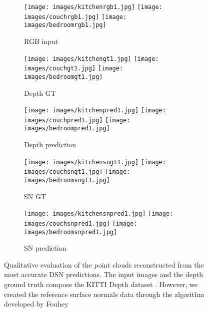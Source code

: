 \documentclass[5p]{elsarticle}
\begin{document}
\begin{figure*}[t!]
     \centering
         \begin{subfigure}[t]{0.19\textwidth}
         \centering
         \caption{RGB input}
         \texttt{[image: images/kitchenrgb1.jpg]}
         \hspace{1em}
         \texttt{[image: images/couchrgb1.jpg]}
         \hspace{1em}
         \texttt{[image: images/bedroomrgb1.jpg]}
         \label{subfig3d:0}
     \end{subfigure}
     \begin{subfigure}[t]{0.19\textwidth}
         \centering
         \caption{Depth GT}
         \texttt{[image: images/kitchengt1.jpg]}
         \hspace{1em}
         \texttt{[image: images/couchgt1.jpg]}
         \hspace{1em}
         \texttt{[image: images/bedroomgt1.jpg]}
         \label{subfig3d:1}
     \end{subfigure}
         \begin{subfigure}[t]{0.19\textwidth}
         \centering
         \caption{Depth prediction}
         \texttt{[image: images/kitchenpred1.jpg]}
         \hspace{1em}
         \texttt{[image: images/couchpred1.jpg]}
         \hspace{1em}
         \texttt{[image: images/bedroompred1.jpg]}
         \label{subfig3d:2}
     \end{subfigure}
     \begin{subfigure}[t]{0.19\textwidth}
         \centering
         \caption{SN GT}
         \texttt{[image: images/kitchensngt1.jpg]}
         \hspace{1em}
         \texttt{[image: images/couchsngt1.jpg]}
         \hspace{1em}
         \texttt{[image: images/bedroomsngt1.jpg]}
         \label{subfig3d:3}
     \end{subfigure}
          \begin{subfigure}[t]{0.19\textwidth}
         \centering
         \caption{SN prediction}
         \texttt{[image: images/kitchensnpred1.jpg]}
         \hspace{1em}
         \texttt{[image: images/couchsnpred1.jpg]}
         \hspace{1em}
         \texttt{[image: images/bedroomsnpred1.jpg]}
         \label{subfig3d:4}
     \end{subfigure}
     \caption{Qualitative evaluation of the point clouds reconstructed from the most accurate DSN predictions. The input images and the depth ground truth compose the KITTI Depth dataset \cite{uhrig2017sparsity}. However, we created the reference surface normals data through the algorithm developed by Fouhey \etal\cite{fouhey2013data}}
     \label{subfig3d:all}
\end{figure*}
\end{document}
